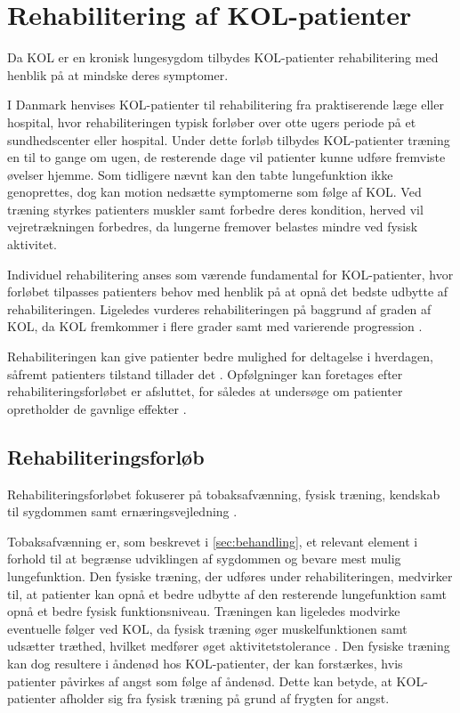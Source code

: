 \section{Rehabilitering af KOL-patienter}
Da KOL er en kronisk lungesygdom tilbydes KOL-patienter rehabilitering med henblik på at mindske deres symptomer. 

I Danmark henvises KOL-patienter til rehabilitering fra praktiserende læge eller hospital, hvor rehabiliteringen typisk forløber over otte ugers periode på et sundhedscenter eller hospital. Under dette forløb tilbydes KOL-patienter træning en til to gange om ugen, de resterende dage vil patienter kunne udføre fremviste øvelser hjemme.\cite{McCarthy2015,Frausing2011b} Som tidligere nævnt kan den tabte lungefunktion ikke genoprettes, dog kan motion nedsætte symptomerne som følge af KOL. Ved træning styrkes patienters muskler samt forbedre deres kondition, herved vil vejretrækningen forbedres, da lungerne fremover belastes mindre ved fysisk aktivitet.\cite{Lungeforeningen2016}

Individuel rehabilitering anses som værende fundamental for KOL-patienter, hvor forløbet tilpasses patienters behov med henblik på at opnå det bedste udbytte af rehabiliteringen.\cite{McCarthy2015,Habraken2011,Sundhedsstyrelsen2015} Ligeledes vurderes rehabiliteringen på baggrund af graden af KOL, da KOL fremkommer i flere grader samt med varierende progression \cite{McCarthy2015}.

Rehabiliteringen kan give patienter bedre mulighed for deltagelse i hverdagen, såfremt patienters tilstand tillader det \cite{McCarthy2015,Habraken2011, Sundhedsstyrelsen2015}. Opfølgninger kan foretages efter rehabiliteringsforløbet er afsluttet, for således at undersøge om patienter opretholder de gavnlige effekter \cite{Frausing2011b}.


\subsection{Rehabiliteringsforløb}
Rehabiliteringsforløbet fokuserer på tobaksafvænning, fysisk træning, kendskab til sygdommen samt ernæringsvejledning \cite{McCarthy2015,Habraken2011,Sundhedsstyrelsen2015}.

Tobaksafvænning er, som beskrevet i \autoref{sec:behandling}, et relevant element i forhold til at begrænse udviklingen af sygdommen og bevare mest mulig lungefunktion. Den fysiske træning, der udføres under rehabiliteringen, medvirker til, at patienter kan opnå et bedre udbytte af den resterende lungefunktion samt opnå et bedre fysisk funktionsniveau.\cite{Sundhedsstyrelsen2015}
Træningen kan ligeledes modvirke eventuelle følger ved KOL, da fysisk træning øger muskelfunktionen samt udsætter træthed, hvilket medfører øget aktivitetstolerance \cite{McCarthy2015}. Den fysiske træning kan dog resultere i åndenød hos KOL-patienter, der kan forstærkes, hvis patienter påvirkes af angst som følge af åndenød. Dette kan betyde, at KOL-patienter afholder sig fra fysisk træning på grund af frygten for angst.\cite{McCarthy2015, Sundhedsstyrelsen2015} 

